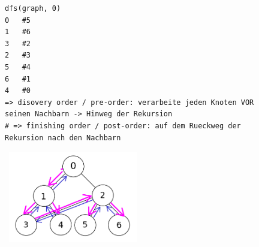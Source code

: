     \newpage
    \begin{figure}[htbp]
        \begin{minipage}[t]{11cm}
            \vspace{0cm}
            \begin{verbatim}
dfs(graph, 0)
0   #5
1   #6
3   #2
2   #3
5   #4
6   #1
4   #0
=> disovery order / pre-order: verarbeite jeden Knoten VOR seinen Nachbarn -> Hinweg der Rekursion
# => finishing order / post-order: auf dem Rueckweg der Rekursion nach den Nachbarn
            \end{verbatim}
        \end{minipage}
        \begin{minipage}[t]{6cm}
            \vspace{0.0cm}
            \includegraphics[width=6cm,height=4cm,keepaspectratio]{./Pictures/DFS.png}
        \end{minipage}
    \end{figure}

